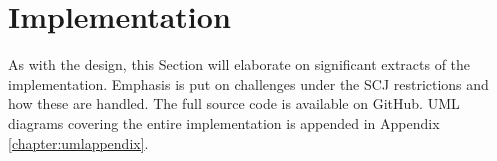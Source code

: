 \section{Implementation}
As with the design, this Section will elaborate on significant extracts of the implementation. Emphasis is put on challenges under the SCJ restrictions and how these are handled. The full source code is available on GitHub\cite{SW902e12:CSPinSCJ}. UML diagrams covering the entire implementation is appended in Appendix \ref{chapter:umlappendix}.